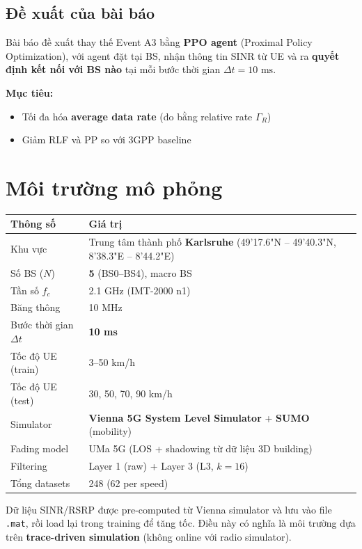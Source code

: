 \documentclass[11pt]{article}
\begin{document}
\subsection{Đề xuất của bài báo}

Bài báo đề xuất thay thế Event A3 bằng \textbf{PPO agent} (Proximal Policy Optimization), với agent đặt tại BS, nhận thông tin SINR từ UE và ra \textbf{quyết định kết nối với BS nào} tại mỗi bước thời gian $\Delta t = 10\text{ ms}$.

\textbf{Mục tiêu:}
\begin{itemize}
  \item Tối đa hóa \textbf{average data rate} (đo bằng relative rate $\Gamma_R$)
  \item Giảm RLF và PP so với 3GPP baseline
\end{itemize}

\section{Môi trường mô phỏng}

\begin{longtable}{@{}p{4.2cm}p{10cm}@{}}
\toprule
\textbf{Thông số} & \textbf{Giá trị} \\
\midrule
\endhead
Khu vực & Trung tâm thành phố \textbf{Karlsruhe} (49\textdegree00'17.6"N -- 49\textdegree00'40.3"N, 8\textdegree22'38.3"E -- 8\textdegree23'44.2"E) \\
Số BS ($N$) & \textbf{5} (BS0--BS4), macro BS \\
Tần số $f_c$ & 2.1 GHz (IMT-2000 n1) \\
Băng thông & 10 MHz \\
Bước thời gian $\Delta t$ & \textbf{10 ms} \\
Tốc độ UE (train) & 3--50 km/h \\
Tốc độ UE (test) & 30, 50, 70, 90 km/h \\
Simulator & \textbf{Vienna 5G System Level Simulator} + \textbf{SUMO} (mobility) \\
Fading model & UMa 5G (LOS + shadowing từ dữ liệu 3D building) \\
Filtering & Layer 1 (raw) + Layer 3 (L3, $k=16$) \\
Tổng datasets & 248 (62 per speed) \\
\bottomrule
\end{longtable}

Dữ liệu SINR/RSRP được pre-computed từ Vienna simulator và lưu vào file \texttt{.mat}, rồi load lại trong training để tăng tốc. Điều này có nghĩa là môi trường dựa trên \textbf{trace-driven simulation} (không online với radio simulator).
\end{document}
